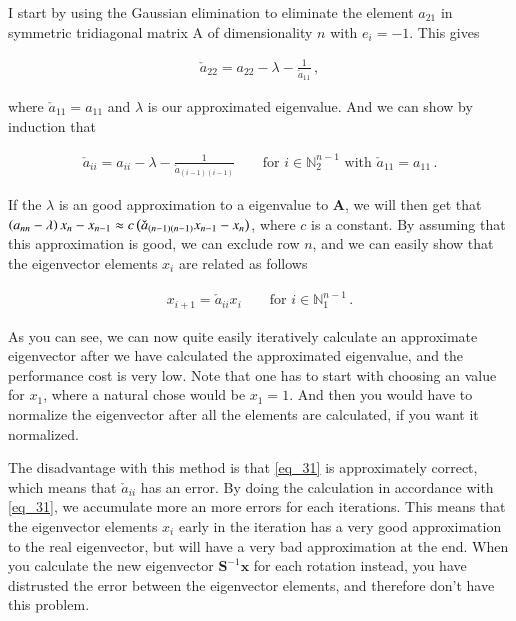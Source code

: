 \documentclass[11pt,english,a4paper]{article}
\begin{document}
\begin{flushleft}
I start by using the Gaussian elimination to eliminate the element $a_{21}$ in symmetric tridiagonal matrix $\text{A}$ of dimensionality $n$ with $e_i=-1$. This gives

\begin{align*}
\check{a}_{22} = a_{22} - \lambda -\frac{1}{\check{a}_{11}} \,,
\end{align*}

where $\check{a}_{11} = a_{11}$ and $\lambda$ is our approximated eigenvalue. And we can show by induction that

\begin{align}
\check{a}_{ii} = a_{ii} - \lambda -\frac{1}{\check{a}_{(i-1)(i-1)}} \qquad \text{for } i\in\mathbb{N}_2^{n-1} \text{ with } \check{a}_{11} = a_{11}\,.
\label{eq_30}
\end{align}

If the $\lambda$ is an good approximation to a eigenvalue to $\textbf{A}$, we will then get that $\left({a_{nn}-\lambda}\right)x_{n}-x_{n-1} \approx c\left({\check{a}_{(n-1)(n-1)} x_{n-1} - x_n}\right)$, where $c$ is a constant. By assuming that this approximation is good, we can exclude row $n$, and we can easily show that the eigenvector elements $x_i$ are related as follows

\begin{align}
x_{i+1} = \check{a}_{ii} x_i \qquad \text{for } i\in\mathbb{N}_1^{n-1} \,.
\label{eq_31}
\end{align}

As you can see, we can now quite easily iteratively calculate an approximate eigenvector after we have calculated the approximated eigenvalue, and the performance cost is very low. Note that one has to start with choosing an value for $x_1$, where a natural chose would be $x_1 = 1$.  And then you would have to normalize the eigenvector after all the elements are calculated, if you want it normalized. \linebreak

The disadvantage with this method is that \eqref{eq_31} is approximately correct, which means that $\check{a}_{ii}$ has an error. By doing the calculation in accordance with \eqref{eq_31}, we accumulate more an more errors for each iterations. This means that the eigenvector elements $x_i$ early in the iteration has a very good approximation to the real eigenvector, but will have a very bad approximation at the end. When you calculate the new eigenvector $\textbf{S}^{-1}\textbf{x}$ for each rotation instead, you have distrusted the error between the eigenvector elements, and therefore don't have this problem.


\end{flushleft}
\end{document}
